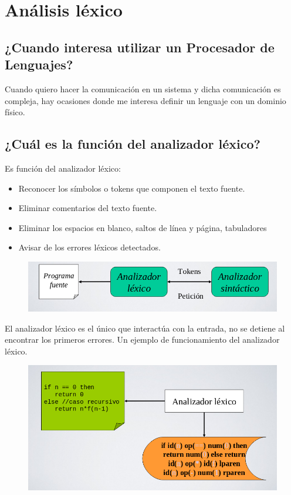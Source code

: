 \chapter{Análisis léxico}
\section{¿Cuando interesa utilizar un Procesador de Lenguajes?}
Cuando quiero hacer la comunicación en un sistema y dicha comunicación es compleja, hay ocasiones donde me interesa definir un lenguaje con un dominio físico.

\section{¿Cuál es la función del analizador léxico?}
Es función del analizador léxico: 
\begin{itemize}
	\item Reconocer los símbolos o tokens que componen el texto fuente.
	\item Eliminar comentarios del texto fuente.
	\item Eliminar los espacios en blanco, saltos de línea y página, tabuladores
	\item Avisar de los errores léxicos detectados.
\end{itemize}

\begin{figure}[h]
	\centering
	\includegraphics[width=0.7\linewidth]{img/lex1}
	\caption{}
	\label{fig:lex1}
\end{figure}

El analizador léxico es el único que interactúa con la entrada, no se detiene al encontrar los primeros errores.
\clearpage
Un ejemplo de funcionamiento del analizador léxico.
\begin{figure}[h]
	\centering
	\includegraphics[width=0.7\linewidth]{img/lex2}
	\caption{}
	\label{fig:lex2}
\end{figure}

